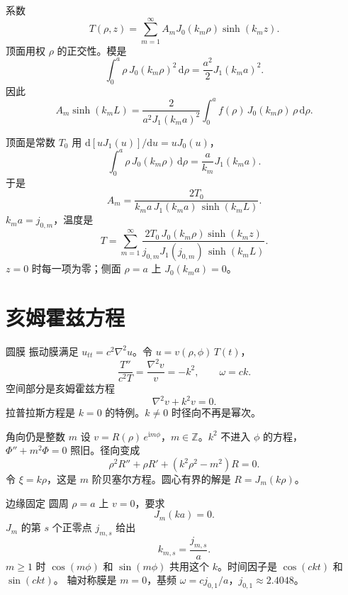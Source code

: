 \documentclass[fontset=windows, chinese, 10pt, xcolor=dvipsnames]{beamer}
\begin{document}
\begin{frame}{系数}
  \[
    T(\rho,z)
    =\sum_{m=1}^{\infty}A_m J_0(k_m\rho)\sinh(k_m z).
  \]
  顶面用权 $\rho$ 的正交性。模是
  \[
    \int_0^{a}\rho\,J_0(k_m\rho)^2\,\mathrm{d}\rho
    =\frac{a^2}{2}J_1(k_m a)^2.
  \]
  因此
  \[
    A_m\sinh(k_m L)
    =\frac{2}{a^2 J_1(k_m a)^2}
      \int_0^{a}f(\rho)\,J_0(k_m\rho)\,\rho\,\mathrm{d}\rho.
  \]
\end{frame}

\begin{frame}{顶面是常数 $T_0$}
  用 $\mathrm{d}[u J_1(u)]/\mathrm{d}u=u J_0(u)$，
  \[
    \int_0^{a}\rho\,J_0(k_m\rho)\,\mathrm{d}\rho
    =\frac{a}{k_m}J_1(k_m a).
  \]
  于是
  \[
    A_m
    =\frac{2T_0}{k_m a\,J_1(k_m a)\,\sinh(k_m L)}.
  \]
  $k_m a=j_{0,m}$，温度是
  \[
    T=\sum_{m=1}^{\infty}
      \frac{2T_0\,J_0(k_m\rho)\sinh(k_m z)}
           {j_{0,m}J_1(j_{0,m})\,\sinh(k_m L)}.
  \]
  $z=0$ 时每一项为零；侧面 $\rho=a$ 上 $J_0(k_m a)=0$。
\end{frame}

\section{亥姆霍兹方程}

\begin{frame}{圆膜}
  振动膜满足 $u_{tt}=c^2\nabla^2 u$。令 $u=v(\rho,\phi)\,T(t)$，
  \[
    \frac{T''}{c^2 T}=\frac{\nabla^2 v}{v}=-k^2,
    \qquad \omega=ck.
  \]
  空间部分是亥姆霍兹方程
  \begin{equation*}
    \boxed{\displaystyle \nabla^2 v+k^2 v=0.}
  \end{equation*}
  拉普拉斯方程是 $k=0$ 的特例。$k\neq 0$ 时径向不再是幂次。
\end{frame}

\begin{frame}{角向仍是整数 $m$}
  设 $v=R(\rho)\,e^{\mathrm{i}m\phi}$，$m\in\mathbb{Z}$。$k^2$ 不进入 $\phi$ 的方程，$\Phi''+m^2\Phi=0$ 照旧。径向变成
  \begin{equation*}
    \boxed{\displaystyle
      \rho^2 R''+\rho R'+(k^2\rho^2-m^2)R=0.}
  \end{equation*}
  令 $\xi=k\rho$，这是 $m$ 阶贝塞尔方程。圆心有界的解是 $R=J_m(k\rho)$。
\end{frame}

\begin{frame}{边缘固定}
  圆周 $\rho=a$ 上 $v=0$，要求
  \[
    J_m(ka)=0.
  \]
  $J_m$ 的第 $s$ 个正零点 $j_{m,s}$ 给出
  \[
    k_{m,s}=\frac{j_{m,s}}{a}.
  \]
  $m\geq 1$ 时 $\cos(m\phi)$ 和 $\sin(m\phi)$ 共用这个 $k$。时间因子是 $\cos(ckt)$ 和 $\sin(ckt)$。
  \vspace{0.3em}
  轴对称膜是 $m=0$，基频 $\omega=c j_{0,1}/a$，$j_{0,1}\approx 2.4048$。
\end{frame}
\end{document}
